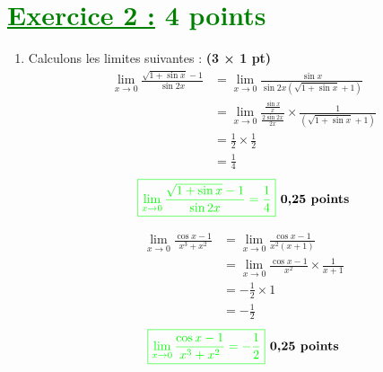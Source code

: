 \documentclass[12pt,a4paper]{article}
\begin{document}
\section*{\textcolor{green}{\underline{Exercice 2 :} 4 points}}

\begin{enumerate}
    \item Calculons les limites suivantes : \textbf{(3 × 1 pt)}
    \begin{align*}
    \lim_{x \to 0} \frac{\sqrt{1+\sin x} - 1}{\sin 2x}&=\lim_{x \to 0} \frac{\sin x }{\sin 2x\left( \sqrt{1+\sin x} + 1\right) }\\
    &=\lim_{x \to 0} \frac{\frac{\sin x}{x} }{\frac{2\sin 2x}{2x}}\times \frac{1}{\left(\sqrt{1+\sin x} + 1\right)}\\
    &=\frac{1}{2}\times\frac{1}{2}\\
    &=\frac{1}{4}
    \end{align*}
\[
\textcolor{green}{\boxed{ \lim_{x \to 0} \frac{\sqrt{1+\sin x} - 1}{\sin 2x}=\frac{1}{4}  }} \textbf{ 0,25 points}
\]

    \begin{align*}
    \lim_{x \to 0} \frac{\cos x - 1}{x^3 + x^2}&=\lim_{x \to 0}\frac{\cos x - 1}{x^2(x + 1)}\\
    &=\lim_{x \to 0} \frac{\cos x - 1}{x^{2}} \times \frac{1}{x+1}\\
    &=-\frac{1}{2}\times1\\
    &=-\frac{1}{2}
    \end{align*}
\[
\textcolor{green}{\boxed{ \lim_{x \to 0} \frac{\cos x - 1}{x^3 + x^2}=-\frac{1}{2}  }} \textbf{ 0,25 points}
\]


\end{enumerate}
\end{document}
